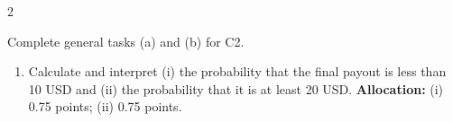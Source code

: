 \begin{multicols*}{2}
\begin{minipage}{\linewidth}
Complete general tasks (a)  and (b)  for C2.
\begin{enumerate}[label=(\alph*),start=3]
\item {} Calculate and interpret (i) the probability that the final payout is less than 10 USD and (ii) the probability that it is at least 20 USD.
\textbf{Allocation:} (i) 0.75 points; (ii) 0.75 points.
\end{enumerate}
\end{minipage}\par\medskip

\end{multicols*}


\clearpage
\begingroup %
\small
\setlength{\parskip}{0pt}\raggedright
\ExplSyntaxOn
{}
\ExplSyntaxOff
\newcommand{\ResponseBox}[1]{%
 \par\noindent\tikz{\node[fill=black!1,draw=black!25,line width=.3pt,
 rounded corners=2mm,inner sep=0pt,outer sep=.3pt,
 minimum width=\dimexpr\linewidth-.6pt\relax,minimum height=#1] {\phantom{0}};}\par}
\newcommand{\ResponseStage}[1]{%
 {\centering\large\bfseries\tikz[baseline=(title.base)]{
 \node[fill=black!10,draw=black,line width=.2pt,rounded corners=2mm,
 inner sep=3pt,outer sep=0pt] (title) {#1};}\par}\nopagebreak}
\newcommand{\ResponseTask}[1]{%
 \par\noindent\tikz[baseline=(title.base)]{\node[fill=black!5,draw=none,
 rounded corners=2mm,inner sep=3pt,outer sep=0pt] (title)
 {\strut\textbf{#1}};}\par\nopagebreak}
\newcommand{\ResponseSub}[1]{\par\textbf{\underline{#1}}\par\nopagebreak}
\newcommand{\VariableSupport}[2]{%
 \ResponseSub{Q#1 (#2): Variable, units and support}\ResponseBox{8mm}}
